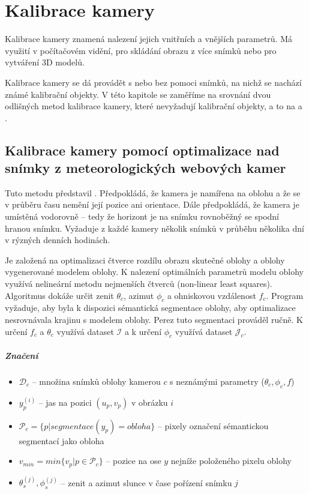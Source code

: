 \chapter{Kalibrace kamery}
Kalibrace kamery znamená nalezení jejich vnitřních a vnějších parametrů.
Má využití v počítačovém vidění, pro skládání obrazu z více snímků nebo pro vytváření 3D modelů.


Kalibrace kamery se dá provádět s nebo bez pomoci snímků, na nichž se nachází známé kalibrační objekty.
V této kapitole se zaměříme na srovnání dvou odlišných metod kalibrace kamery, které nevyžadují kalibrační objekty, a to na \cite{Lalonde10} a \cite{deepcalib}.


\section{Kalibrace kamery pomocí optimalizace nad snímky z meteorologických webových kamer}
Tuto metodu představil \cite{Lalonde10}. 
Předpokládá, že kamera je namířena na oblohu a že se v průběru času nemění její pozice ani orientace. 
Dále předpokládá, že kamera je umístěná vodorovně – tedy že horizont je na snímku rovnoběžný se spodní hranou snímku.
Vyžaduje z každé kamery několik snímků v průběhu několika dní v rýzných denních hodinách.

Je založená na optimalizaci čtverce rozdílu obrazu skutečné oblohy a oblohy vygenerované modelem oblohy. 
K nalezení optimálních parametrů modelu oblohy využívá nelineární metodu nejmenších čtverců (non-linear least squares).
Algoritmus dokáže určit zenit $\theta_c$, azimut $\phi_c$ a ohniskovou vzdálenost $f_c$.
Program vyžaduje, aby byla k dispozici sémantická segmentace oblohy, aby optimalizace nesrovnávala krajinu s modelem oblohy. Perez tuto segmentaci prováděl ručně. 
K určení $f_c$ a $\theta_c$ využívá dataset $\mathcal{I}$ a k určení $\phi_c$ využívá dataset $\mathcal{J}_c$. 


\paragraph{Značení}
\begin{itemize}
    \item $\mathcal{D}_c$ – množina snímků oblohy kamerou $c$ s neznámými parametry ($\theta_c, \phi_c, f$)
    \item $y^{(i)}_p$ – jas na pozici $(u_p, v_p)$ v obrázku $i$
    \item $\mathcal{P}_c  = \{p | segmentace(y_{p}) = obloha\}$ – pixely označení sémantickou segmentací jako obloha
    \item $v_{min} = min\{ v_p | p \in \mathcal{P}_c \}$ – pozice na ose $y$ nejníže položeného pixelu oblohy
    \item $\theta^{(j)}_s, \phi^{(j)}_s$ – zenit a azimut slunce v čase pořízení snímku $j$
\end{itemize}

